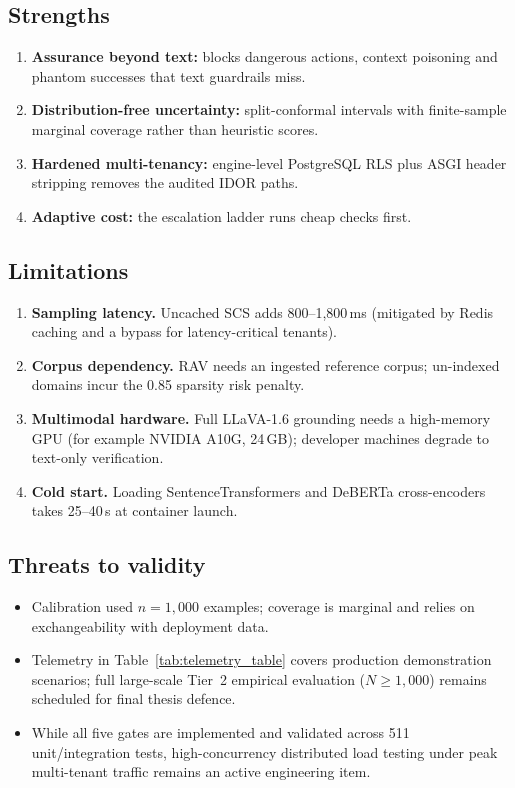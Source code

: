 \documentclass[11pt,a4paper]{article}
\begin{document}
\subsection{Strengths}
\begin{enumerate}[leftmargin=*,itemsep=1pt]
  \item \textbf{Assurance beyond text:} blocks dangerous actions, context poisoning and phantom successes that text guardrails miss.
  \item \textbf{Distribution-free uncertainty:} split-conformal intervals with finite-sample marginal coverage rather than heuristic scores.
  \item \textbf{Hardened multi-tenancy:} engine-level PostgreSQL RLS plus ASGI header stripping removes the audited IDOR paths.
  \item \textbf{Adaptive cost:} the escalation ladder runs cheap checks first.
\end{enumerate}

\subsection{Limitations}
\begin{enumerate}[leftmargin=*,itemsep=1pt]
  \item \textbf{Sampling latency.} Uncached SCS adds 800--1,800\,ms (mitigated by Redis caching and a bypass for latency-critical tenants).
  \item \textbf{Corpus dependency.} RAV needs an ingested reference corpus; un-indexed domains incur the 0.85 sparsity risk penalty.
  \item \textbf{Multimodal hardware.} Full LLaVA-1.6 grounding needs a high-memory GPU (for example NVIDIA A10G, 24\,GB); developer machines degrade to text-only verification.
  \item \textbf{Cold start.} Loading SentenceTransformers and DeBERTa cross-encoders takes 25--40\,s at container launch.
\end{enumerate}

\subsection{Threats to validity}
\begin{itemize}[leftmargin=*,itemsep=1pt]
  \item Calibration used $n=1{,}000$ examples; coverage is marginal and relies on exchangeability with deployment data.
  \item Telemetry in Table~\ref{tab:telemetry_table} covers production demonstration scenarios; full large-scale Tier~2 empirical evaluation ($N\ge1{,}000$) remains scheduled for final thesis defence.
  \item While all five gates are implemented and validated across 511 unit/integration tests, high-concurrency distributed load testing under peak multi-tenant traffic remains an active engineering item.
\end{itemize}
\end{document}
